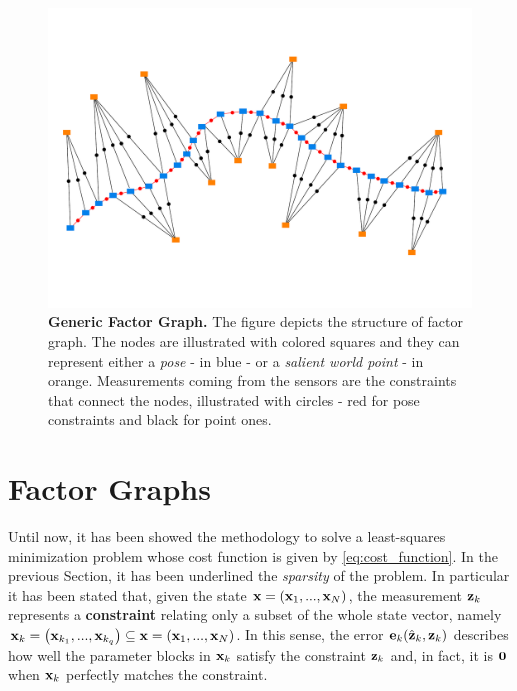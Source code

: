 \begin{figure}[!hbt]
    \centering
    \includegraphics[width=\textwidth]{figures/02_basics/factor_graph.pdf}
    \caption{\textbf{Generic Factor Graph.} The figure depicts the structure of factor graph. The nodes are illustrated with colored squares and they can represent either a \textit{pose} - in blue - or a \textit{salient world point} - in orange. Measurements coming from the sensors are the constraints that connect the nodes, illustrated with circles - red for pose constraints and black for point ones.} 
    \label{fig:factor_graph}
\end{figure}

\section{Factor Graphs}\label{sec:factor_graph}
Until now, it has been showed the methodology to solve a least-squares minimization problem whose cost function is given by \ref{eq:cost_function}. In the previous Section, it has been underlined the \textit{sparsity} of the problem. In particular it has been stated that, given the state $\mathbf{x} = \left(\mathbf{x}_1, ..., \mathbf{x}_N\right)$, the measurement $\mathbf{z}_k$ represents a \textbf{constraint} relating only a subset of the whole state vector, namely $\mathbf{x}_k = \left(\mathbf{x}_{k_1}, ..., \mathbf{x}_{k_q}\right) \subseteq \mathbf{x} = \left(\mathbf{x}_1, ..., \mathbf{x}_N\right)$. In this sense, the error $\mathbf{e}_k(\hat{\mathbf{z}}_k, \mathbf{z}_k)$ describes how well the parameter blocks in $\mathbf{x}_k$ satisfy the constraint $\mathbf{z}_k$ and, in fact, it is $\mathbf{0}$ when $\mathbf{x}_k$ perfectly matches the constraint.


